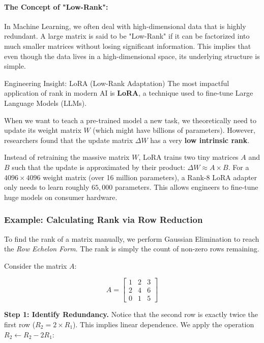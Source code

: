\paragraph{The Concept of "Low-Rank":}
In Machine Learning, we often deal with high-dimensional data that is highly redundant. A large matrix is said to be "Low-Rank" if it can be factorized into much smaller matrices without losing significant information. This implies that even though the data lives in a high-dimensional space, its underlying structure is simple.

\begin{unibobox}{Engineering Insight: LoRA (Low-Rank Adaptation)}
The most impactful application of rank in modern AI is \textbf{LoRA}, a technique used to fine-tune Large Language Models (LLMs).

When we want to teach a pre-trained model a new task, we theoretically need to update its weight matrix $W$ (which might have billions of parameters). However, researchers found that the update matrix $\Delta W$ has a very \textbf{low intrinsic rank}.

Instead of retraining the massive matrix $W$, LoRA trains two tiny matrices $A$ and $B$ such that the update is approximated by their product: $\Delta W \approx A \times B$.
For a $4096 \times 4096$ weight matrix (over 16 million parameters), a Rank-8 LoRA adapter only needs to learn roughly $65,000$ parameters. This allows engineers to fine-tune huge models on consumer hardware.
\end{unibobox}

\subsubsection*{Example: Calculating Rank via Row Reduction}

To find the rank of a matrix manually, we perform Gaussian Elimination to reach the \textit{Row Echelon Form}. The rank is simply the count of non-zero rows remaining.

Consider the matrix $A$:

\begin{equation*}
A =
\begin{bmatrix}
1 & 2 & 3 \\
2 & 4 & 6 \\
0 & 1 & 5
\end{bmatrix}
\end{equation*}

\textbf{Step 1: Identify Redundancy.}
Notice that the second row is exactly twice the first row ($R_2 = 2 \times R_1$). This implies linear dependence. We apply the operation $R_2 \leftarrow R_2 - 2R_1$:

